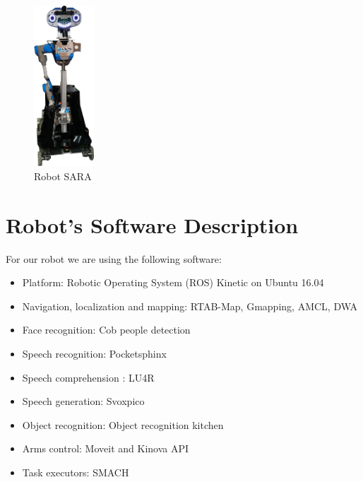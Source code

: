 \begin{figure}
	\centering
	\includegraphics[width=0.20\textwidth]{images/sara_full.png}
	\caption{Robot SARA}
\end{figure}
\section*{Robot's Software Description}

For our robot we are using the following software:

\begin{itemize}
	\item Platform: Robotic Operating System (ROS) Kinetic on Ubuntu 16.04
	\item Navigation, localization and mapping: RTAB-Map, Gmapping, AMCL, DWA
	\item Face recognition: Cob people detection
	\item Speech recognition: Pocketsphinx
	\item Speech comprehension : LU4R
	\item Speech generation: Svoxpico
	\item Object recognition: Object recognition kitchen
	\item Arms control: Moveit and Kinova API
	\item Task executors: SMACH
\end{itemize}